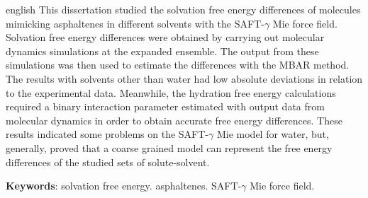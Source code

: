 \documentclass[
	12pt,				%
	openany,			%
	oneside,			%
	a4paper,			%
	english,			%
	brazil				%
	]{abntex2}
\begin{document}
\begin{resumo}[Abstract]
 \begin{otherlanguage*}{english}
  This dissertation studied the solvation free energy differences of molecules mimicking asphaltenes in different solvents with the SAFT-$\gamma$ Mie force field. Solvation free energy differences were obtained by carrying out molecular dynamics simulations at the expanded ensemble. The output from these simulations was then used to estimate the differences with the MBAR method. The results with solvents other than water had low absolute deviations in relation to the experimental data. Meanwhile, the hydration free energy calculations required a binary interaction parameter estimated with output data from molecular dynamics in order to obtain accurate free energy differences. These results indicated some problems on the SAFT-$\gamma$ Mie model for water, but, generally, proved that a coarse grained model can represent the free energy differences of the studied sets of solute-solvent.

   \vspace{\onelineskip}
 
   \noindent 
   \textbf{Keywords}: solvation free energy. asphaltenes. SAFT-$\gamma$ Mie force field.
 \end{otherlanguage*}
\end{resumo}

\listoffigures*
\cleardoublepage

\listoftables*
\cleardoublepage
\end{document}
